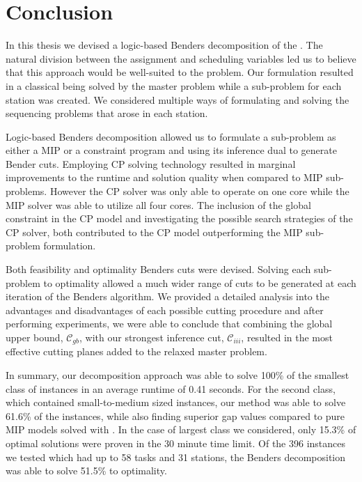 

\chapter{Conclusion}
\label{chap:conc}

In this thesis we devised a logic-based Benders decomposition
of the .
The natural division between the assignment and scheduling
variables led us to believe that this approach would be
well-suited to the problem.
Our formulation resulted in a classical 
being solved by the master problem while
a sub-problem for each station was created.
We considered multiple ways of formulating and solving the sequencing
problems that arose in each station.

Logic-based Benders decomposition allowed us to 
formulate a sub-problem as either a MIP or a constraint program and 
using its inference dual to generate Bender cuts.
Employing CP solving technology resulted in marginal
improvements to the runtime and solution quality when compared
to MIP sub-problems.
However the CP solver \chuffed was only able to 
operate on one core while the MIP solver \gurobi was able to utilize
all four cores.
The inclusion of the global constraint \cumu in the CP model
and investigating the possible search strategies of the CP solver,
both contributed to the CP model outperforming the
MIP sub-problem formulation.

Both feasibility and optimality Benders cuts were devised.
Solving each sub-problem to optimality allowed a much wider
range of cuts to be generated at each iteration of the Benders
algorithm.
We provided a detailed analysis into the advantages and disadvantages
of each possible cutting procedure and after performing experiments,
we were able to conclude that combining the global upper bound, $\mathcal{C}_{gb}$,
with our strongest inference cut, $\mathcal{C}_{iii}$, resulted
in the most effective cutting planes added to the relaxed master problem.

In summary, our decomposition approach was able to solve
100\% of the smallest class of instances in an average runtime of
0.41 seconds.
For the second class, which contained small-to-medium sized instances,
our method was able to solve 61.6\% of the instances, while also
finding superior gap values compared to pure MIP models solved with \gurobi.
In the case of largest class we considered, only 15.3\% of optimal solutions
were proven in the 30 minute time limit.
Of the 396 instances we tested which had up to 58 tasks and 31 stations,
the Benders decomposition was able to solve 51.5\% to optimality.

